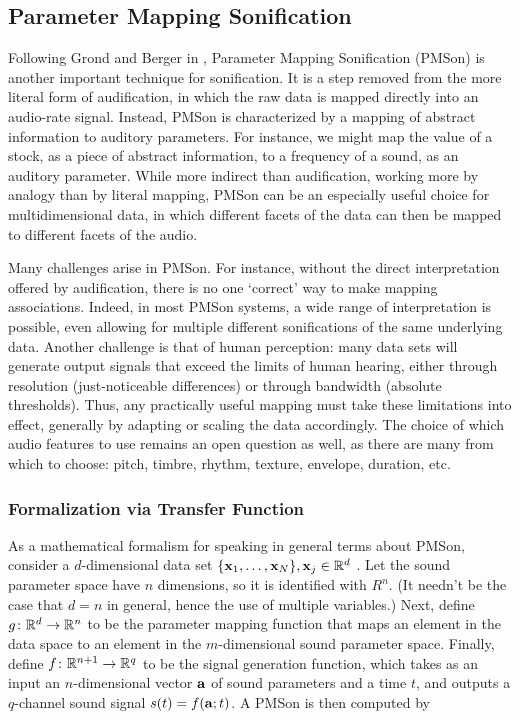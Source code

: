 \subsection{Parameter Mapping Sonification}
Following Grond and Berger in \cite{hermann2011sonification}, Parameter Mapping Sonification (PMSon) is another important technique for 
sonification. It is a step removed from the more literal form of 
audification, in which the raw data is mapped directly into an audio-rate 
signal. Instead, PMSon is characterized by a mapping of abstract information 
to auditory parameters. For instance, we might map the value of a stock, as a 
piece of abstract information, to a frequency of a sound, as an auditory 
parameter. While more indirect than audification, working more by analogy 
than by literal mapping, PMSon can be an especially useful choice for 
multidimensional data, in which different facets of the data can then be 
mapped to different facets of the audio.

Many challenges arise in PMSon. For instance, without the direct 
interpretation offered by audification, there is no one `correct' way to make 
mapping associations. Indeed, in most PMSon systems, a wide range of 
interpretation is possible, even allowing for multiple different 
sonifications of the same underlying data. Another challenge is that of human 
perception: many data sets will generate output signals that exceed the 
limits of human hearing, either through resolution (just-noticeable 
differences) or through bandwidth (absolute thresholds). Thus, any 
practically useful mapping must take these limitations into effect, generally 
by adapting or scaling the data accordingly. The choice of which audio 
features to use remains an open question as well, as there are many from 
which to choose: pitch, timbre, rhythm, texture, envelope, duration, etc. 

\subsubsection{Formalization via Transfer Function}
As a mathematical formalism for speaking in general terms about PMSon, 
consider a $d$-dimensional data set $\{\mathbf{x}_1, \dots, \mathbf{x}_N\}, \mathbf{x}_j \in \mathbb{R}^d$
. Let the sound parameter space have $n$ dimensions, so it is identified with 
$R^n$. (It needn't be the case that $d = n$ in general, hence the use of 
multiple variables.) Next, define $g \colon \mathbb{R}^d \rightarrow \mathbb{R}^n$ to be the 
parameter mapping function that maps an element in the data space to an 
element in the $m$-dimensional sound parameter space.  Finally, define $f 
\colon \mathbb{R}^{n + 1} \rightarrow \mathbb{R}^q$ to be the signal generation function, 
which takes as an input an $n$-dimensional vector $\mathbf{a}$ of sound parameters 
and a time $t$, and outputs a $q$-channel sound signal $s(t) = f(\mathbf{a}; t)$. A 
PMSon is then computed by

